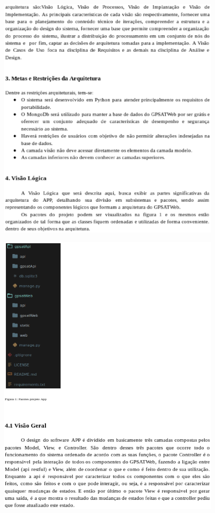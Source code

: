 \begin{apendicesenv}
\begin{figure}[H]
		        \includegraphics[keepaspectratio=true, scale=1]{editaveis/images/arqpag4.eps}
	\end{figure}
	\newpage
	\begin{figure}[H]
		    \label{fig30}
		        \includegraphics[keepaspectratio=true, scale=1]{editaveis/images/arqpag5.eps}

\end{figure}
\end{apendicesenv}

